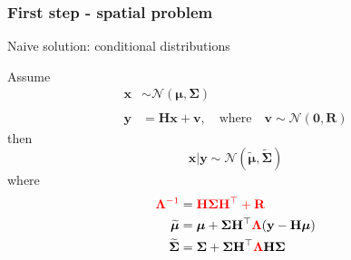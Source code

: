 \documentclass[usenames,dvipsnames,svgnames,table]{beamer}
\newcommand{\bv}{\mathbf{v}}
\newcommand{\bx}{\mathbf{x}}
\newcommand{\by}{\mathbf{y}}
\newcommand{\bH}{\mathbf{H}}
\newcommand{\bR}{\mathbf{R}}
\newcommand{\bfzero}{\mathbf{0}}
\newcommand{\bfmu}{\bm{\mu}}
\newcommand{\bfSigma}{\bm{\Sigma}}
\newcommand{\bfLambda}{\bm{\Lambda}}
\newcommand{\normal}{\mathcal{N}}
\begin{document}
\begin{frame}
\begin{table}
\begin{tabular}{cc|c|c}
	\end{tabular}
\end{table}

\end{frame}




\begin{frame}
	\frametitle{First step - spatial problem}
	Naive solution: conditional distributions
	
	Assume 
	\begin{align*}	
	\bx &\sim \normal(\bfmu, \bfSigma)\\ 
	\\
	\by &= \bH\bx + \bv, \quad \text{where} \quad \bv \sim \normal(\bfzero, \bR)
	\end{align*}\pause
	then	
	$$\bx | \by\sim \normal(\widetilde{\bfmu}, \widetilde{\bfSigma})$$\pause
	where 
	\begin{align*}
		{\color{red} \bfLambda^{-1}} &= {\color{red}\bH\bfSigma\bH^\top + \bR  }\\
		\widetilde{\bfmu} &= \bfmu +  \bfSigma\bH^\top {\color{red}\bfLambda} (\by - \bH\bfmu)\\
		\widetilde{\bfSigma} &= \bfSigma +  \bfSigma\bH^\top {\color{red}\bfLambda} \bH\bfSigma
	\end{align*}
	
\end{frame}
\end{document}
